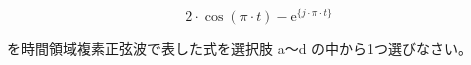 \[
2 \cdot \cos (\pi \cdot t) - \textrm{e}^{\{j \cdot \pi \cdot t \}}
\]

\bigskip
\noindent を時間領域複素正弦波で表した式を選択肢 a〜d の中から1つ選びなさい。
